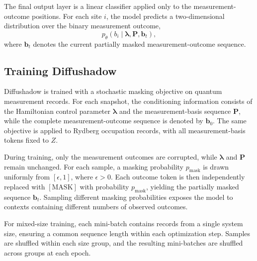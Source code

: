 \documentclass[pdflatex,sn-nature]{sn-jnl}%
\theoremstyle{thmstyleone}%
\theoremstyle{thmstyletwo}%
\theoremstyle{thmstylethree}%
\begin{document}
The final output layer is a linear classifier applied only to the measurement-outcome positions. For each site \(i\), the model predicts a two-dimensional distribution over the binary measurement outcome,
\begin{equation}
p_\theta(b_i \mid \boldsymbol{\lambda}, \mathbf{P}, \mathbf{b}_t),
\end{equation}
where \(\mathbf{b}_t\) denotes the current partially masked measurement-outcome sequence. 


\subsection{Training Diffushadow}
\label{sec:method_training}

Diffushadow is trained with a stochastic masking objective on quantum measurement records. For each snapshot, the conditioning information consists of the Hamiltonian control parameter \(\boldsymbol{\lambda}\) and the measurement-basis sequence \(\mathbf{P}\), while the complete measurement-outcome sequence is denoted by \(\mathbf{b}_0\). The same objective is applied to Rydberg occupation records, with all measurement-basis tokens fixed to \(Z\).

During training, only the measurement outcomes are corrupted, while \(\boldsymbol{\lambda}\) and \(\mathbf{P}\) remain unchanged. For each sample, a masking probability \(p_{\mathrm{mask}}\) is drawn uniformly from \([\epsilon,1]\), where \(\epsilon>0\). Each outcome token is then independently replaced with \([\mathrm{MASK}]\) with probability \(p_{\mathrm{mask}}\), yielding the partially masked sequence \(\mathbf{b}_t\). Sampling different masking probabilities exposes the model to contexts containing different numbers of observed outcomes.

For mixed-size training, each mini-batch contains records from a single system size, ensuring a common sequence length within each optimization step. Samples are shuffled within each size group, and the resulting mini-batches are shuffled across groups at each epoch.
\end{document}
